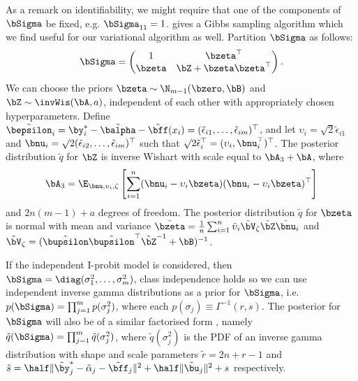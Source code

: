 As a remark on identifiability, we might require that one of the components of $\bSigma$ be fixed, e.g. $\bSigma_{11} = 1$.
\cite{mcculloch2000bayesian} gives a Gibbs sampling algorithm which we find useful for our variational algorithm as well.
Partition $\bSigma$ as follows:
\[
  \bSigma = \begin{pmatrix}
    1       &\bzeta^\top \\
    \bzeta  &\bZ + \bzeta\bzeta^\top
  \end{pmatrix}.
\]
We can choose the priors $\bzeta \sim \N_{m-1}(\bzero,\bB)$ and $\bZ \sim \invWis(\bA,a)$, independent of each other with appropriately chosen hyperparameters.
Define $\tilde\bepsilon_i = \by^*_i - \tilde\balpha - \tilde\bff(x_i) = (\tilde\epsilon_{i1},\dots,\tilde\epsilon_{im})^\top$, and let $\upsilon_i = \surd 2 \tilde\epsilon_{i1}$ and $\bnu_i = \surd 2(\tilde\epsilon_{i2},\dots,\tilde\epsilon_{im})^\top$ such that $\surd 2\tilde\epsilon_i^\top = (\upsilon_i, \bnu_i^\top)^\top$.
The posterior distribution $\tilde q$ for $\bZ$ is inverse Wishart with scale equal to $\bA_3 + \bA$, where
\begin{align*}
  \begin{gathered}
    \bA_3 = \E_{\bnu,\upsilon_i,\zeta} \left[ \sum_{i=1}^n (\bnu_i - \upsilon_i \bzeta)(\bnu_i - \upsilon_i \bzeta)^\top \right]   \\
    \end{gathered}
\end{align*}
and $2n(m-1)+a$ degrees of freedom.
The posterior distribution $\tilde q$ for $\bzeta$ is normal with mean and variance $\tilde\bzeta = \frac{1}{n}\sum_{i=1}^n \tilde\upsilon_i \tilde\bV_\zeta \tilde\bZ\tilde\bnu_i$ and $\tilde\bV_\zeta = (\tilde\bupsilon\tilde\bupsilon^\top\tilde\bZ^{-1} +\bB)^{-1}$.

If the independent I-probit model is considered, then $\bSigma = \diag(\sigma_1^2,\dots,\sigma_m^2)$, class independence holds so we can use independent inverse gamma distributions as a prior for $\bSigma$, i.e. $ p(\bSigma) = \prod_{j=1}^m  p(\sigma_j^2)$, where each $p(\sigma_j) \equiv \Gamma^{-1}(r,s)$.
The posterior for $\bSigma$ will also be of a similar factorised form , namely $\tilde q(\bSigma) = \prod_{j=1}^m \tilde q(\sigma_j^2)$, where $\tilde q(\sigma_j^2)$ is the PDF of an inverse gamma distribution with shape and scale parameters $\tilde r = 2n+r-1$ and $\tilde s = \half\Vert \tilde\by^*_j - \tilde\alpha_j - \tilde\bff_j \Vert^2 + \half \Vert \tilde\bu_j \Vert^2 + s$ respectively.

